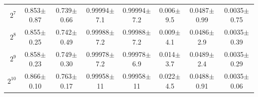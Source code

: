\begin{table}[t]
{\begin{tabular}{r cc cc c cc}
  $2^{7}$ & 0.853\tiny{$\pm$0.87} & 0.739\tiny{$\pm$0.66} & 0.99994\tiny{$\pm$7.1} & 0.99994\tiny{$\pm$7.2} & 0.006\tiny{$\pm$9.5} & 0.0487\tiny{$\pm$0.99} & 0.0035\tiny{$\pm$0.75} \\
  $2^{8}$ & 0.855\tiny{$\pm$0.25} & 0.742\tiny{$\pm$0.49} & 0.99988\tiny{$\pm$7.2} & 0.99988\tiny{$\pm$7.2} & 0.009\tiny{$\pm$4.1} & 0.0486\tiny{$\pm$2.9} & 0.0035\tiny{$\pm$0.39} \\
  $2^{9}$ & 0.858\tiny{$\pm$0.23} & 0.749\tiny{$\pm$0.30} & 0.99978\tiny{$\pm$7.2} & 0.99978\tiny{$\pm$6.9} & 0.014\tiny{$\pm$3.7} & 0.0489\tiny{$\pm$2.4} & 0.0035\tiny{$\pm$0.29} \\
  $2^{10}$ & 0.866\tiny{$\pm$0.10} & 0.763\tiny{$\pm$0.17} & 0.99958\tiny{$\pm$11} & 0.99958\tiny{$\pm$11} & 0.022\tiny{$\pm$4.5} & 0.0488\tiny{$\pm$0.91} & 0.0035\tiny{$\pm$0.06} \\
\bottomrule
\end{tabular}}
\end{table}

